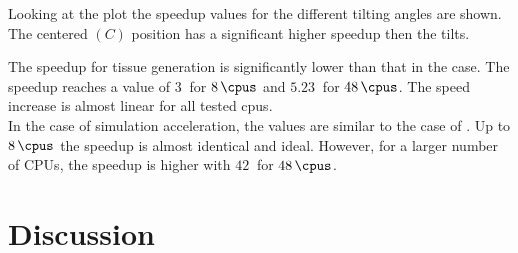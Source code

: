 Looking at the plot the speedup values for the different tilting angles are shown.
The centered $(C)$ position has a significant higher speedup then the tilts.
\par
%
The \openmp{} speedup for tissue generation is significantly lower than that in the \mpi{} case.
The speedup reaches a value of $\SI{3}{}$ for $\SI{8}{\cpus}$ and $\SI{5.23}{}$ for $\SI{48}{\cpus}$.
The speed increase is almost linear for all tested cpus.
\\
%
In the case of simulation acceleration, the values are similar to the case of \mpi{}.
Up to $\SI{8}{\cpus}$ the speedup is almost identical and ideal.
However, for a larger number of \acsp{CPU}, the speedup is higher with $\SI{42}{}$ for $\SI{48}{\cpus}$.
%
%
\section{Discussion}
%
